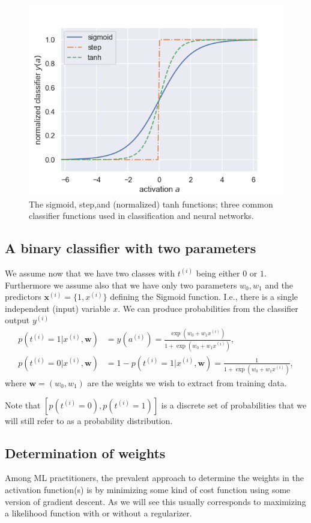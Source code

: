 \documentclass[%
oneside,                 %
final,                   %
10pt]{article}
\begin{document}
\begin{figure}[!ht]  %
  \centerline{\includegraphics[width=0.8\linewidth]{fig/logistic_functions.png}}
  \caption{
  The sigmoid, step,and (normalized) tanh functions; three common classifier functions used in classification and neural networks. \label{fig:logistic}
  }
\end{figure}


\subsection{A binary classifier with two parameters}

We assume now that we have two classes with $t^{(i)}$ being either $0$ or $1$. Furthermore we assume also that we have only two parameters $w_0, w_1$ and the predictors $\boldsymbol{x}^{(i)} = \{ 1, x^{(i)} \}$ defining the Sigmoid function. I.e., there is a single independent (input) variable $x$. We can produce probabilities from the classifier output $y^{(i)}$
\begin{align*}
p(t^{(i)}=1|x^{(i)},\boldsymbol{w}) &= y(a^{(i)})= \frac{\exp{(w_0+w_1x^{(i)})}}{1+\exp{(w_0+w_1x^{(i)})}},\\
p(t^{(i)}=0|x^{(i)},\boldsymbol{w}) &= 1 - p(t^{(i)}=1|x^{(i)},\boldsymbol{w}) = \frac{1}{1+\exp{(w_0+w_1x^{(i)})}},
\end{align*}
where $\boldsymbol{w} = ( w_0, w_1)$ are the weights we wish to extract from training data. 

Note that $[p(t^{(i)}=0), p(t^{(i)}=1)]$ is a discrete set of probabilities that we will still refer to as a probability distribution.

\subsection{Determination of weights}
Among ML practitioners, the prevalent approach to determine the weights in the activation function(s) is by minimizing some kind of cost function using some version of gradient descent. As we will see this usually corresponds to maximizing a likelihood function with or without a regularizer.
\end{document}
